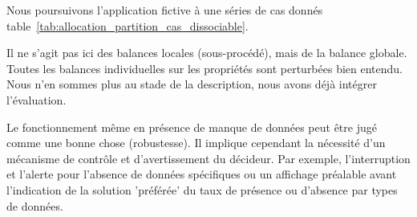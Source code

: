 Nous poursuivons l'application fictive à une séries de cas donnés table~\ref{tab:allocation_partition_cas_dissociable}.
\begin{table}[h!]
  \begin{center}
  \end{center}
  \caption{Allocation par partition, différents cas fictifs de l'hétérogénéité à l'incommensurabilité.}
  \label{tab:allocation_partition_cas_dissociable}
  \end{table}
Il ne s'agit pas ici des balances locales (sous-procédé), mais de la balance globale.
Toutes les balances individuelles sur les propriétés sont perturbées bien entendu.
Nous n'en sommes plus au stade de la description, nous avons déjà intégrer l'évaluation.

Le fonctionnement même en présence de manque de données peut être jugé comme une bonne chose (robustesse).
Il implique cependant la nécessité d'un mécanisme de contrôle et d'avertissement du décideur.
Par exemple, l’interruption et l'alerte pour l'absence de données spécifiques ou un affichage préalable avant l'indication de la solution 'préférée' du taux de présence ou d’absence par types de données.

